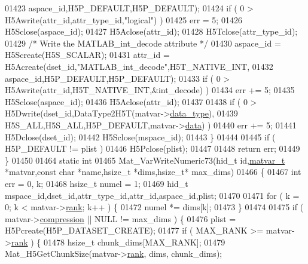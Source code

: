 \begin{DoxyCode}
{{01423                             aspace\_id,H5P\_DEFAULT,H5P\_DEFAULT);
01424         \textcolor{keywordflow}{if} ( 0 > H5Awrite(attr\_id,attr\_type\_id,\textcolor{stringliteral}{"logical"}) )
01425             err = 5;
01426         H5Sclose(aspace\_id);
01427         H5Aclose(attr\_id);
01428         H5Tclose(attr\_type\_id);
01429         \textcolor{comment}{/* Write the MATLAB\_int\_decode attribute */}
01430         aspace\_id = H5Screate(H5S\_SCALAR);
01431         attr\_id = H5Acreate(dset\_id,\textcolor{stringliteral}{"MATLAB\_int\_decode"},H5T\_NATIVE\_INT,
01432                             aspace\_id,H5P\_DEFAULT,H5P\_DEFAULT);
01433         \textcolor{keywordflow}{if} ( 0 > H5Awrite(attr\_id,H5T\_NATIVE\_INT,&int\_decode) )
01434             err += 5;
01435         H5Sclose(aspace\_id);
01436         H5Aclose(attr\_id);
01437 
01438         \textcolor{keywordflow}{if} ( 0 > H5Dwrite(dset\_id,DataType2H5T(matvar->\hyperlink{group___m_a_t_ab6aafe9bd77f0f077852593dec438144}{data\_type}),
01439                           H5S\_ALL,H5S\_ALL,H5P\_DEFAULT,matvar->\hyperlink{group___m_a_t_a5672978efa230bbdecdf38ede781f7fa}{data}) )
01440             err += 5;
01441         H5Dclose(dset\_id);
01442         H5Sclose(mspace\_id);
01443     \}
01444 
01445     \textcolor{keywordflow}{if} ( H5P\_DEFAULT != plist )
01446         H5Pclose(plist);
01447 
01448     \textcolor{keywordflow}{return} err;
01449 \}
01450 
01464 \textcolor{keyword}{static} \textcolor{keywordtype}{int}
01465 Mat\_VarWriteNumeric73(hid\_t \textcolor{keywordtype}{id},\hyperlink{group___m_a_t_structmatvar__t}{matvar\_t} *matvar,\textcolor{keyword}{const} \textcolor{keywordtype}{char} *name,hsize\_t *dims,hsize\_t* max\_dims)
01466 \{
01467     \textcolor{keywordtype}{int} err = 0, k;
01468     hsize\_t numel = 1;
01469     hid\_t mspace\_id,dset\_id,attr\_type\_id,attr\_id,aspace\_id,plist;
01470 
01471     \textcolor{keywordflow}{for} ( k = 0; k < matvar->\hyperlink{group___m_a_t_a84ba70c96ded13cc555fa75b768d9921}{rank}; k++ ) \{
01472         numel *= dims[k];
01473     \}
01474 
01475     \textcolor{keywordflow}{if} ( matvar->\hyperlink{group___m_a_t_aeef0466048621cb2c959ba7f6c774d06}{compression} || NULL != max\_dims ) \{
01476         plist = H5Pcreate(H5P\_DATASET\_CREATE);
01477         \textcolor{keywordflow}{if} ( MAX\_RANK >= matvar->\hyperlink{group___m_a_t_a84ba70c96ded13cc555fa75b768d9921}{rank} ) \{
01478             hsize\_t chunk\_dims[MAX\_RANK];
01479             Mat\_H5GetChunkSize(matvar->\hyperlink{group___m_a_t_a84ba70c96ded13cc555fa75b768d9921}{rank}, dims, chunk\_dims);
}}
\end{DoxyCode}
